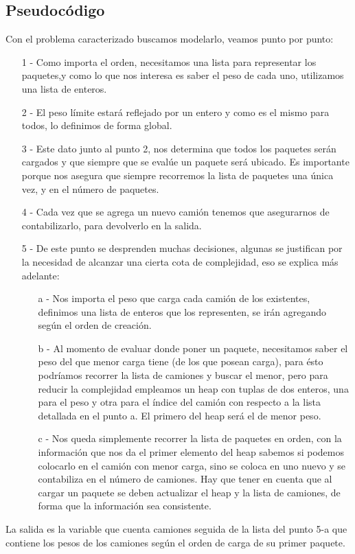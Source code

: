 \subsection{Pseudoc\'odigo}

Con el problema caracterizado buscamos modelarlo, veamos punto por punto:
\begin{itemize}
\item[1]- Como importa el orden, necesitamos una lista para representar los paquetes,y como lo que nos interesa es saber el peso de cada uno, utilizamos una lista de enteros.
\item[2]- El peso límite estará reflejado por un entero y como es el mismo para todos, lo definimos de forma global.
\item[3]- Este dato junto al punto 2, nos determina que todos los paquetes serán cargados y que siempre que se evalúe un paquete será ubicado. Es importante porque nos asegura que siempre recorremos la lista de paquetes una única vez, y en el número de paquetes.
\item[4]- Cada vez que se agrega un nuevo camión tenemos que asegurarnos de contabilizarlo, para devolverlo en la salida.

\item[5]- De este punto se desprenden muchas decisiones, algunas se justifican por la necesidad de alcanzar una cierta cota de complejidad, eso se explica más adelante:
	\begin{enumerate}
	\item[a] - Nos importa el peso que carga cada camión de los existentes, definimos una lista de enteros que los representen, se irán agregando según el orden de creación.
	\item[b] - Al momento de evaluar donde poner un paquete, necesitamos saber el peso del que menor carga tiene (de los que posean carga), para ésto podríamos recorrer la lista de camiones y buscar el menor, pero para reducir la complejidad empleamos un heap con tuplas de dos enteros, una para el peso y otra para el índice del camión con respecto a la lista detallada en el punto a. El primero del heap será el de menor peso.
	\item[c] - Nos queda simplemente recorrer la lista de paquetes en orden, con la información que nos da el primer elemento del heap sabemos si podemos colocarlo en el camión con menor carga, sino se coloca en uno nuevo y se contabiliza en el número de camiones. Hay que tener en cuenta que al cargar un paquete se deben actualizar el heap y la lista de camiones, de forma que la información sea consistente.
	\end{enumerate}
\end{itemize}
La salida es la variable que cuenta camiones seguida de la lista del punto 5-a que contiene los pesos de los camiones según el orden de carga de su primer paquete.


